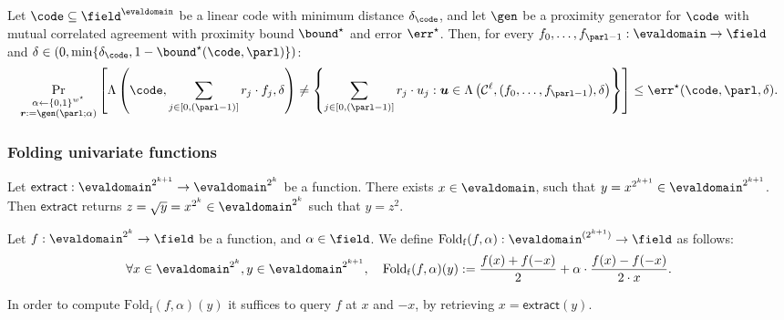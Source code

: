 \begin{lemma}\label{lemma: mutual_corrAgr_listdecoding}
    Let $\code \subseteq \field^{\evaldomain}$ be a linear code with minimum distance $\delta_{\code}$, and let $\gen$ be a proximity generator for $\code$ with mutual correlated agreement with proximity bound ${\bound}^\star$ and error $\err^\star$. Then, for every $f_0, \ldots, f_{\parl-1} : \evaldomain \to \field$ and $\delta \in (0, \min\{\delta_{\code}, 1 - {\bound}^\star(\code, \parl)\})$:
    \[
    \Pr_{\substack{\alpha \leftarrow \{0,1\}^{w^\star} \\ \boldsymbol{r} := \gen(\parl; \alpha)}} \left[
    \Lambda\left(\code, \sum_{j \in [0,(\parl-1)]} r_j \cdot f_j, \delta \right) \neq 
    \left\{ \sum_{j \in [0,(\parl-1)]} r_j \cdot u_j : \boldsymbol{u} \in \Lambda\left(\mathcal{C}^\ell, (f_0, \ldots, f_{\parl-1}), \delta \right) \right\}
    \right] \leq \err^\star(\code, \parl, \delta).
    \]
\end{lemma}

\subsubsection{Folding univariate functions}

\begin{definition}\label{def:extract}
    Let $\mathsf{extract}:\evaldomain^{2^{k+1}}\rightarrow \evaldomain^{2^k}$ be a function. There exists $x \in \evaldomain$, such that $y = x^{2^{k+1}}\in\evaldomain^{2^{k+1}}$. Then $\mathsf{extract}$ returns $z = \sqrt{y} = x^{2^k}\in\evaldomain^{2^k}$ such that $y = z^2$.
\end{definition}

\begin{definition}\label{def:foldf}
    Let $f : \evaldomain^{2^k} \to \field$ be a function, and $\alpha \in \field$. We define $\mathrm{Fold_f}(f, {\alpha}) : \evaldomain^{(2^{k+1})} \to \field$ as follows:
    \[
    \forall x \in \evaldomain^{2^k}, y \in \evaldomain^{2^{k+1}}, \quad \mathrm{Fold_f}(f, \alpha)(y) := \frac{f(x) + f(-x)}{2} + \alpha \cdot \frac{f(x) - f(-x)}{2 \cdot x}.
    \]

    In order to compute $\mathrm{Fold_f}(f, \alpha)(y)$ it suffices to query $f$ at $x$ and $-x$, by retrieving $x=\mathsf{extract}(y)$.
\end{definition}

